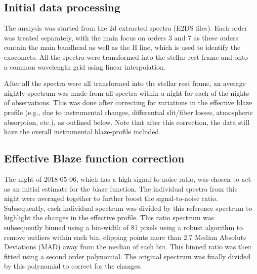 \documentclass{aa}
\begin{document}
\subsection{Initial data processing}
The analysis was started from the 2d extracted spectra (E2DS files).
%
Each order was treated separately, with the main focus on orders 3 and 7 as these orders contain the main  bandhead as well as the  H line, which is used to identify the exocomets.
%
All the spectra were transformed into the stellar rest-frame and onto a common wavelength grid using linear interpolation. %

%
After all the spectra were all transformed into the stellar rest frame, an average nightly spectrum was made from all spectra within a night for each of the nights of observations. This was done after correcting for variations in the effective blaze profile (e.g., due to instrumental changes, differential slit/fiber losses, atmospheric absorption, etc.), as outlined below. Note that after this correction, the %
data still have the overall instrumental blaze-profile included.%

\subsection{Effective Blaze function correction}\label{sect:blaze}

The night of 2018-05-06, which has a high signal-to-noise ratio, was chosen to act as an initial estimate for the blaze function.%
%
The individual spectra from this night were averaged together to further boost the signal-to-noise ratio.
%
Subsequently, each individual spectrum was divided by this reference spectrum to highlight the changes in the effective profile.
%
This ratio spectrum was subsequently binned using a bin-width of 81 pixels using a robust algorithm to remove outliers within each bin, clipping points more than 2.7 Median Absolute Deviations (MAD) away from the median of each bin.
%
This binned ratio was then fitted using a second order polynomial.
%
The original spectrum was finally divided by this polynomial to correct for the changes.
\end{document}
